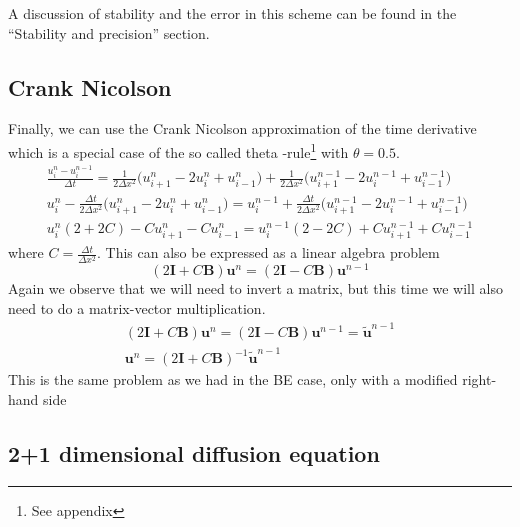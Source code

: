 \documentclass[a4paper,english, 10pt, twoside]{article}
\begin{document}
A discussion of stability and the error in this scheme can be found in the ``Stability and precision'' section.

\subsection{Crank Nicolson}
Finally, we can use the Crank Nicolson approximation of the time derivative which is a special case of the so called theta -rule\footnote{See appendix} 
with $\theta = 0.5$.
\begin{align*}
 \frac{u^n_i - u^{n-1}_i}{\Delta t} = \frac{1}{2\Delta x^2}\Big(u^n_{i+1} -2u^n_{i} + u^n_{i-1}\Big) +\frac{1}{2\Delta x^2}
 \Big(u^{n-1}_{i+1} -2u^{n-1}_{i} + u^{n-1}_{i-1}\Big) \\
 u^n_i -\frac{\Delta t}{2\Delta x^2}\Big(u^n_{i+1} -2u^n_{i} + u^n_{i-1}\Big) = u^{n-1}_i + 
 \frac{\Delta t}{2\Delta x^2}\Big(u^{n-1}_{i+1} -2u^{n-1}_{i} + u^{n-1}_{i-1}\Big)\\
 u^n_i(2+2C) - Cu^n_{i+1} - Cu^n_{i-1} = u^{n-1}_i(2-2C) + Cu^{n-1}_{i+1} + Cu^{n-1}_{i-1}
\end{align*}
where $C = \frac{\Delta t}{\Delta x^2}$. This can also be expressed as a linear algebra problem
\begin{equation}\label{CN}
 (2\mathbf{I}+C\mathbf{B})\mathbf{u}^n = (2\mathbf{I}-C\mathbf{B})\mathbf{u}^{n-1}
\end{equation}
Again we observe that we will need to invert a matrix, but this time we will also need to do a matrix-vector multiplication.
\begin{align*}
 (2\mathbf{I}+C\mathbf{B})\mathbf{u}^n = (2\mathbf{I}-C\mathbf{B})\mathbf{u}^{n-1} = \tilde{\mathbf{u}}^{n-1}\\
 \mathbf{u}^n = (2\mathbf{I}+C\mathbf{B})^{-1}\tilde{\mathbf{u}}^{n-1}
\end{align*}
This is the same problem as we had in the BE case, only with a modified right-hand side

\subsection{2+1 dimensional diffusion equation}
\end{document}
